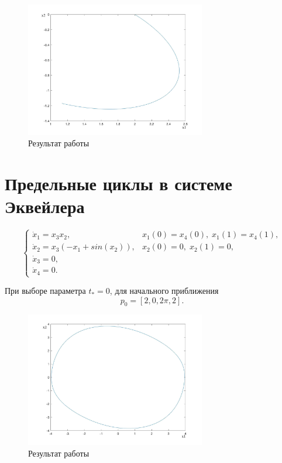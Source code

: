 \documentclass[oneside,final,12pt]{extreport}
\begin{document}
\begin{figure}[H]
	\centering
	\includegraphics[width=0.7\textwidth]{8}
	\caption{Результат работы}
	\label{gr1}
\end{figure}

\section*{Предельные циклы в системе Эквейлера}

$$
\begin{cases}
\dot{x}_1=x_3x_2, &x_1(0)=x_4(0), \;x_1(1)=x_4(1),
\\
\dot{x}_2=x_3(-x_1+sin(x_2)), &x_2(0)=0, \;x_2(1)=0,
\\
\dot{x}_3=0, 
\\
\dot{x}_4=0.
\end{cases}	
$$

\noindent При выборе параметра $t_* = 0$, для начального приближения 
$$
p_0 = [2, 0, 2\pi, 2].
$$


\begin{figure}[H]
	\centering
	\includegraphics[width=0.7\textwidth]{9}
	\caption{Результат работы}
	\label{gr1}
\end{figure}
\end{document}
